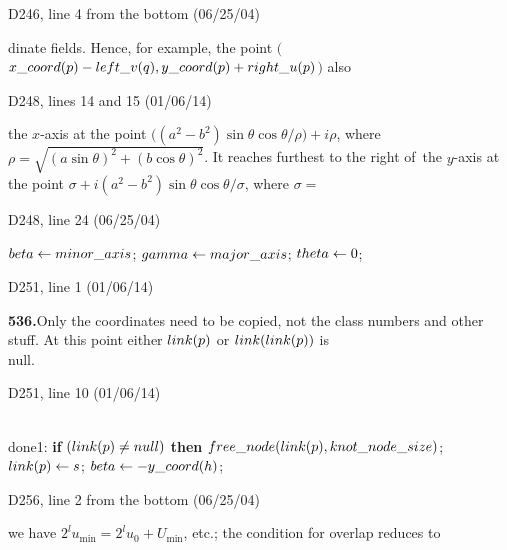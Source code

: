{{\bugonpage D246, line 4 from the bottom (06/25/04)

\noindent
dinate fields. Hence, for example,
the point $\bigl($$\\{x\_coord}(p)-\\{left\_v}(q),\\{y\_coord}(p)+%
\\{right\_u}(p)$$\bigr)$
also\cutpar

\bugonpage D248, lines 14 and 15 (01/06/14)

\noindent
the $x$-axis at the point
$\bigl((a^2-b^2)\sin\theta\cos\theta/\rho\bigr)+i\rho$, where
\vadjust{\vskip1pt}%
$\rho=\sqrt{(a\sin\theta)^2+(b\cos\theta)^2}$. It reaches
furthest to the right of~the $y$-axis at the point
$\sigma+i(a^2-b^2)\sin\theta\cos\theta/\sigma$, where
$\sigma=$\cutpar

\bugonpage D248, line 24 (06/25/04)

\ninepoint\noindent
{} $\\{beta}\gets\\{minor\_axis}$;
 $\\{gamma}\gets\\{major\_axis}$;
 $\\{theta}\gets0$;

\bugonpage D251, line 1 (01/06/14)

\noindent
{\bf536.\quad}Only the coordinates need to be copied, not the class numbers
and other stuff. At this point either $\\{link}(p)$ or
$\\{link}(\\{link}(p))$ is \\{null}.

\bugonpage D251, line 10 (01/06/14)

\ninepoint\noindent
\\{done1}: {\bf if\/} $(\\{link}(p)\ne\\{null})$ {\bf then}
$\\{free\_node}(\\{link}(p),\\{knot\_node\_size})$;\hfil\break
\null\quad$\\{link}(p)\gets s$;
$\\{beta}\gets-\\{y\_coord}(h)$;

\bugonpage D256, line 2 from the bottom (06/25/04)

\noindent
we have $2^lu_{\min}=2^lu_0+U_{\min}$, etc.; the condition for overlap
reduces to

}}
